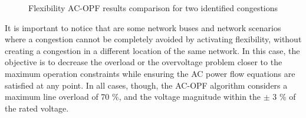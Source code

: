 \begin{figure}[htbp]
\centering     %
{}
\caption{Flexibility AC-OPF results comparison for two identified congestions}
\label{fig:case2_fr}
\end{figure}

It is important to notice that are some network buses and network scenarios where a congestion cannot be completely avoided by activating flexibility, without creating a congestion in a different location of the same network. In this case, the objective is to decrease the overload or the overvoltage problem closer to the maximum operation constraints while ensuring the AC power flow equations are satisfied at any point. In all cases, though, the AC-OPF algorithm considers a maximum line overload of 70 \%, and the voltage magnitude within the $\pm$ 3 \% of the rated voltage. 

